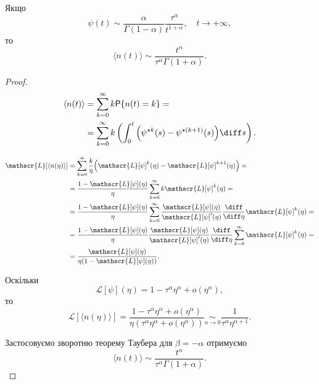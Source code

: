 \begin{lemma}
    Якщо 
    \begin{equation}
        \psi(t) \sim \frac{\alpha}{\Gamma(1 - \alpha)} \frac{\tau^\alpha}{t^{1 + \alpha}}, \quad t \to + \infty,
    \end{equation}
    то
    \begin{equation}
        \langle n(t) \rangle \sim \frac{t^\alpha}{\tau^\alpha \Gamma(1 + \alpha)}.
    \end{equation}
\end{lemma}

\begin{proof}
    \begin{equation}
        \begin{aligned}
            \langle n(t) \rangle 
            &= \sum_{k = 0}^\infty k \mathsf{P}\{n (t) = k\} = \\
            &= \sum_{k = 0}^\infty k \left( \int_0^t \Big( \psi^{\star k}(s) - \psi^{\star (k + 1)}(s) \Big) \diff s \right).
        \end{aligned}
    \end{equation}

    \begin{equation}
        \begin{aligned}
            \mathscr{L}[\langle n(\eta) \rangle] 
            &= \sum_{k = 0}^\infty \frac{k}{\eta} \Big( \mathscr{L}[\psi]^k(\eta) - \mathscr{L}[\psi]^{k + 1}(\eta) \Big) = \\
            &= \frac{1 - \mathscr{L}[\psi](\eta)}{\eta} \sum_{k = 0}^\infty k \mathscr{L}[\psi]^k(\eta) = \\
            &= \frac{1 - \mathscr{L}[\psi](\eta)}{\eta} \sum_{k = 0}^\infty \frac{\mathscr{L}[\psi](\eta)}{\mathscr{L}[\psi]'(\eta)} \frac{\diff}{\diff \eta} \mathscr{L}[\psi]^k(\eta) = \\
            &= \frac{1 - \mathscr{L}[\psi](\eta)}{\eta} \frac{\mathscr{L}[\psi](\eta)}{\mathscr{L}[\psi]'(\eta)} \frac{\diff}{\diff \eta} \sum_{k = 0}^\infty \mathscr{L}[\psi]^k(\eta) = \\
            &= \frac{\mathscr{L}[\psi](\eta)}{\eta (1 - \mathscr{L}[\psi](\eta))}.
        \end{aligned}
    \end{equation}

    Оскільки
    \begin{equation}
        \mathscr{L}[\psi](\eta) = 1 - \tau^\alpha \eta^\alpha + o(\eta^\alpha),
    \end{equation}
    то
    \begin{equation}
        \mathscr{L}[\langle n(\eta) \rangle] = \frac{1 - \tau^\alpha \eta^\alpha + o(\eta^\alpha)}{\eta (\tau^\alpha \eta^\alpha + o(\eta^\alpha))} \underset{n \to 0}{\sim} \frac{1}{\tau^\alpha \eta^{\alpha + 1}}.
    \end{equation}

    Застосовуємо зворотню теорему Таубера для $\beta = - \alpha$ отримуємо
    \begin{equation}
        \langle n(t) \rangle \sim \frac{t^\alpha}{\tau^\alpha \Gamma(1 + \alpha)}.
    \end{equation}
\end{proof}

